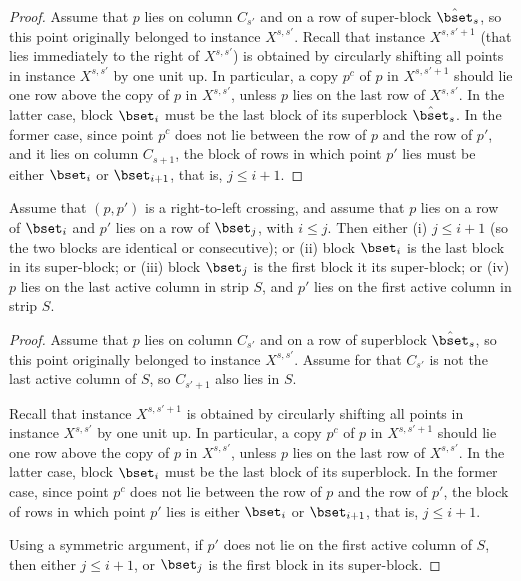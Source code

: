 \begin{proof}
Assume that $p$ lies on column $C_{s'}$ and on a row of super-block $\hat\bset_s$, so this point originally belonged to instance $X^{s,s'}$. Recall that instance $X^{s,s'+1}$  (that lies immediately to the right of $X^{s,s'}$) is obtained by circularly shifting all points in instance $X^{s,s'}$ by one unit up. In particular, a copy $p^c$ of $p$ in $X^{s,s'+1}$ should lie one row above the copy of $p$ in $X^{s,s'}$, unless $p$ lies on the last row of $X^{s,s'}$. In the latter case, block $\bset_i$ must be the last block of its superblock $\hat \bset_s$. In the former case, since point $p^c$ does not lie between the row of $p$ and the row of $p'$, and it lies on column $C_{s+1}$, the block of rows in which point $p'$ lies must be either $\bset_i$ or $\bset_{i+1}$, that is, $j\leq i+1$.
\end{proof}

\begin{claim}\label{claim: right to left crossing}
	Assume that $(p,p')$ is a right-to-left crossing, and assume that $p$ lies on a row of $\bset_i$ and $p'$ lies on a row of $\bset_j$, with $i\leq j$. Then either (i) $j\leq i+1$ (so the two blocks are identical or consecutive); or (ii) block $\bset_i$ is the last block in its super-block; or (iii) block $\bset_j$ is the first block it its super-block; or (iv) $p$ lies on the last active column in strip $S$, and $p'$ lies on the first active column in strip $S$.
\end{claim}

\begin{proof}
	Assume that $p$ lies on column $C_{s'}$ and on a row of superblock $\hat \bset_s$, so this point originally belonged to instance $X^{s,s'}$. 
	Assume for that $C_{s'}$ is not the last active column of $S$, so $C_{s'+1}$ also lies in $S$. 
	
	Recall that instance $X^{s,s'+1}$ is obtained by circularly shifting all points in instance $X^{s,s'}$ by one unit up. In particular, a copy $p^c$ of $p$ in $X^{s,s'+1}$ should lie one row above the copy of $p$ in $X^{s,s'}$, unless $p$ lies on the last row of $X^{s,s'}$. In the latter case, block $\bset_i$ must be the last block of its superblock. In the former case, since point $p^c$ does not lie between the row of $p$ and the row of $p'$, the block of rows in which point $p'$ lies is either $\bset_i$ or $\bset_{i+1}$,  that is, $j\leq i+1$.
	
	Using a symmetric argument, if $p'$ does not lie on the first active column of $S$, then either $j\leq i+1$, or $\bset_j$ is the first block in its super-block.
\end{proof}

